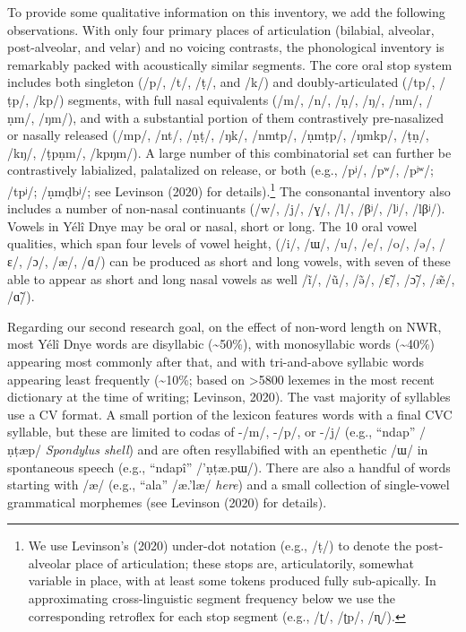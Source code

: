 \documentclass[english,,man,floatsintext]{apa6}
\begin{document}
To provide some qualitative information on this inventory, we add the following observations. With only four primary places of articulation (bilabial, alveolar, post-alveolar, and velar) and no voicing contrasts, the phonological inventory is remarkably packed with acoustically similar segments. The core oral stop system includes both singleton (/p/, /t/, /ṭ/, and /k/) and doubly-articulated (/tp/, /ṭp/, /kp/) segments, with full nasal equivalents (/m/, /n/, /ṇ/, /ŋ/, /nm/, /ṇm/, /ŋm/), and with a substantial portion of them contrastively pre-nasalized or nasally released (/mp/, /nt/, /ṇṭ/, /ŋk/, /nmtp/, /ṇmṭp/, /ŋmkp/, /ṭṇ/, /kŋ/, /ṭpṇm/, /kpŋm/). A large number of this combinatorial set can further be contrastively labialized, palatalized on release, or both (e.g., /pʲ/, /pʷ/, /pʲʷ/; /tpʲ/; /ṇmḍbʲ/; see Levinson (2020) for details).\footnote{We use Levinson's (2020) under-dot notation (e.g., /ṭ/) to denote the post-alveolar place of articulation; these stops are, articulatorily, somewhat variable in place, with at least some tokens produced fully sub-apically. In approximating cross-linguistic segment frequency below we use the corresponding retroflex for each stop segment (e.g., /ʈ/, /ʈp/, /ɳ/).} The consonantal inventory also includes a number of non-nasal continuants (/w/, /j/, /ɣ/, /l/, /βʲ/, /lʲ/, /lβʲ/). Vowels in Yélî Dnye may be oral or nasal, short or long. The 10 oral vowel qualities, which span four levels of vowel height, (/i/, /ɯ/, /u/, /e/, /o/, /ə/, /ɛ/, /ɔ/, /æ/, /ɑ/) can be produced as short and long vowels, with seven of these able to appear as short and long nasal vowels as well /ĩ/, /ũ/, /ə̃/, /ɛ̃/, /ɔ̃/, /æ̃/, /ɑ̃/).

Regarding our second research goal, on the effect of non-word length on NWR, most Yélî Dnye words are disyllabic (\textasciitilde{}50\%), with monosyllabic words (\textasciitilde{}40\%) appearing most commonly after that, and with tri-and-above syllabic words appearing least frequently (\textasciitilde{}10\%; based on \textgreater{}5800 lexemes in the most recent dictionary at the time of writing; Levinson, 2020). The vast majority of syllables use a CV format. A small portion of the lexicon features words with a final CVC syllable, but these are limited to codas of -/m/, -/p/, or -/j/ (e.g., \enquote{ndap} /ṇṭæp/ \emph{Spondylus shell}) and are often resyllabified with an epenthetic /ɯ/ in spontaneous speech (e.g., \enquote{ndapî} /'ṇṭæ.pɯ/). There are also a handful of words starting with /æ/ (e.g., \enquote{ala} /æ.'læ/ \emph{here}) and a small collection of single-vowel grammatical morphemes (see Levinson (2020) for details).
\end{document}
